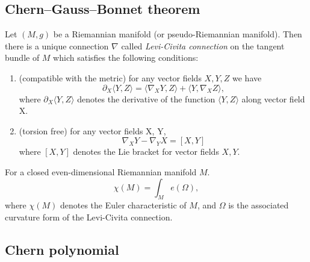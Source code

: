 \documentclass[11pt]{homework}
\theoremstyle{indented}
\begin{document}
\subsection{Chern–Gauss–Bonnet theorem}

\begin{theorem}
    Let $(M, g)$ be a Riemannian manifold (or pseudo-Riemannian manifold). Then there is a unique connection $\nabla$ called \textit{Levi-Civita connection} on the tangent bundle of $M$ which satisfies the following conditions:
    \begin{enumerate}
        \item (compatible with the metric)
        for any vector fields $X, Y, Z$ we have
        \begin{equation*}
            \partial _{X}\langle Y,Z\rangle =\langle \nabla _{X}Y,Z\rangle +\langle Y,\nabla _{X}Z\rangle ,
        \end{equation*}
        where $\partial _{X}\langle Y,Z\rangle$ denotes the derivative of the function $\langle Y,Z\rangle$ along vector field X.
        \item (torsion free)
        for any vector fields X, Y,
        \begin{equation*}
            \nabla _{X}Y-\nabla _{Y}X=[X,Y]
        \end{equation*}
        where $[X, Y]$ denotes the Lie bracket for vector fields $X, Y$.
    \end{enumerate}
\end{theorem}

\begin{theorem}
    For a closed even-dimensional Riemannian manifold $M$.
    \begin{equation*}
        \chi (M)=\int _{M}e(\Omega ),
    \end{equation*}
    where $\chi (M)$ denotes the Euler characteristic of $M$, and $\Omega$ is the associated curvature form of the Levi-Civita connection.
\end{theorem}

\subsection{Chern polynomial}
\end{document}
